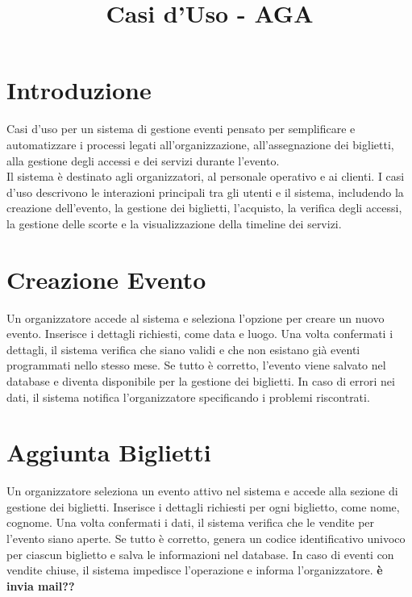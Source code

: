 \documentclass[a4paper,12pt]{article}
\title{\textcolor{titlecolor}{\Huge Casi d'Uso - AGA \\ \text{Formato Breve}}}
\author{}
\date{}
\begin{document}
\maketitle

\section*{\textcolor{sectioncolor}{Introduzione}}
\textcolor{textcolor}{

Casi d’uso per un sistema di gestione eventi pensato per semplificare e automatizzare i processi legati all'organizzazione, all'assegnazione dei biglietti, alla gestione degli accessi e dei servizi durante l'evento. \\ Il sistema è destinato agli organizzatori, al personale operativo e ai clienti.
I casi d'uso descrivono le interazioni principali tra gli utenti e il sistema, includendo la creazione dell'evento, la gestione dei biglietti, l'acquisto, la verifica degli accessi, la gestione delle scorte e la visualizzazione della timeline dei servizi.

}

\section{\textcolor{sectioncolor}{Creazione Evento}}
\textcolor{textcolor}{
Un organizzatore accede al sistema e seleziona l'opzione per creare un nuovo evento. Inserisce i dettagli richiesti, come data e luogo. Una volta confermati i dettagli, il sistema verifica che siano validi e che non esistano già eventi programmati nello stesso mese. Se tutto è corretto, l’evento viene salvato nel database e diventa disponibile per la gestione dei biglietti. In caso di errori nei dati, il sistema notifica l’organizzatore specificando i problemi riscontrati.
}

\section{\textcolor{sectioncolor}{Aggiunta Biglietti}}
\textcolor{textcolor}{
Un organizzatore seleziona un evento attivo nel sistema e accede alla sezione di gestione dei biglietti. Inserisce i dettagli richiesti per ogni biglietto, come nome, cognome. Una volta confermati i dati, il sistema verifica che le vendite per l’evento siano aperte. Se tutto è corretto, genera un codice identificativo univoco per ciascun biglietto e salva le informazioni nel database. In caso di eventi con vendite chiuse, il sistema impedisce l’operazione e informa l’organizzatore. \textbf{è invia mail??}
}
\end{document}
